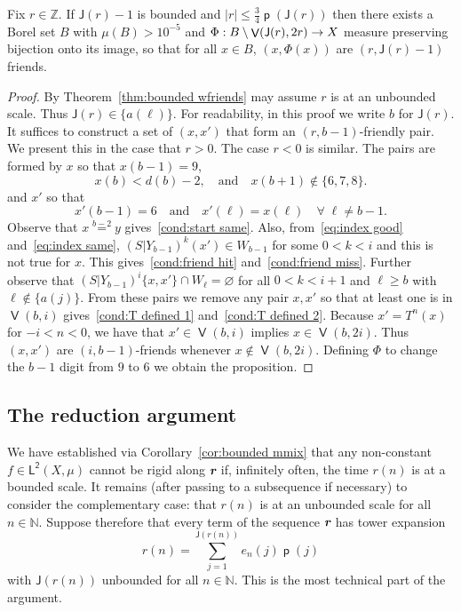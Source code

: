 \documentclass[AHL,Unicode,longabstracts,published]{cedram}
\DeclareMathOperator{\bad}{\mathsf{V}}
\DeclareMathOperator{\p}{\mathsf{p}}
\newcommand{\N}{\mathbb{N}}
\newcommand{\Z}{\mathbb{Z}}
\newcommand{\lp}{\mathsf{L}}
\newcommand{\ltwo}{\lp^{\!\mathsf{2}}}
\newcommand{\scl}{\mathsf{J}}
\def\mathbi#1{\textbf{\em #1}}
\newcommand{\bir}{\mathbi{r}}
\renewcommand{\emptyset}{\varnothing}
\renewcommand*{\to}{\mathchoice{\longrightarrow}{\rightarrow}{\rightarrow}{\rightarrow}}
\let\oldforall\forall
\renewcommand*{\forall}{\mathrel{\oldforall}}
\begin{document}
\begin{prop}\label{prop:small friend}
Fix $r \in \Z$. If $\scl(r) - 1$ is bounded and $|r|\leq \frac{3}{4} \p(\scl(r))$ then there exists a Borel set $B$ with $\mu(B)>10^{-5}$ and $\Phi:B \setminus \bad(\scl(r),2r) \to X$ measure preserving bijection onto its image, so that for all $x \in B$, $(x,\Phi(x))$ are $(r,\scl(r)-1)$ friends.
\end{prop}
\begin{proof}
By Theorem~\ref{thm:bounded wfriends} may assume $r$ is at an unbounded scale. Thus $\scl(r) \in \{a(\ell)\}$. For readability, in this proof we write $b$ for $\scl(r)$. It suffices to construct a set of $(x,x')$ that form an $(r,b-1)$-friendly pair. We present this in the case that $r>0$. The case $r<0$ is similar. The pairs are formed by $x$ so that $x(b-1)=9$,
\begin{equation}\label{eq:index good}
x(b) < d(b)-2, \quad\text{and}\quad x(b+1)\notin \{6, 7,8\}.
\end{equation}
and $x'$ so that
\begin{equation}\label{eq:index same}
x'(b-1) = 6 \quad\text{and}\quad x'(\ell)=x(\ell)\quad \forall\; \ell \neq b-1.
\end{equation}
Observe that $x \overset{b-2}{=} y$ gives~\eqref{cond:start same}. Also, from~\eqref{eq:index good} and~\eqref{eq:index same}, $(S|Y_{b-1})^k(x') \in W_{b-1}$ for some $0<k<i$ and this is not true for $x$. This gives~\eqref{cond:friend hit} and~\eqref{cond:friend miss}. Further observe that $(S|Y_{b-1})^i \{x,x'\} \cap W_\ell = \emptyset$ for all $0<k<i+1$ and $\ell \geq b$ with $\ell \notin \{a(j)\}$. From these pairs we remove any pair $x,x'$ so that at least one is in $\bad(b,i)$ gives~\eqref{cond:T defined 1} and~\eqref{cond:T defined 2}. Because $x'=T^n(x)$ for $-i<n<0$, we have that $x' \in \bad(b,i)$ implies $x \in \bad(b,2i)$. Thus $(x,x')$ are $(i,b-1)$-friends whenever $x \notin \bad(b,2i)$. Defining $\Phi$ to change the $b-1$ digit from $9$ to $6$ we obtain the proposition.
\end{proof}



\subsection{The reduction argument}\label{subsec:reduction summary}

We have established via Corollary~\ref{cor:bounded mmix} that any non-constant $f \in \ltwo(X,\mu)$ cannot be rigid along $\bir$ if, infinitely often, the time $r(n)$ is at a bounded scale. It remains (after passing to a subsequence if necessary) to consider the complementary case: that $r(n)$ is at an unbounded scale for all $n \in \N$. Suppose therefore that every term of the sequence $\bir$ has tower expansion
\[
r(n) = \sum_{j=1}^{\scl(r(n))} e_n(j) \p(j)
\]
with $\scl(r(n))$ unbounded for all $n \in \N$. This is the most technical part of the argument.
\end{document}
